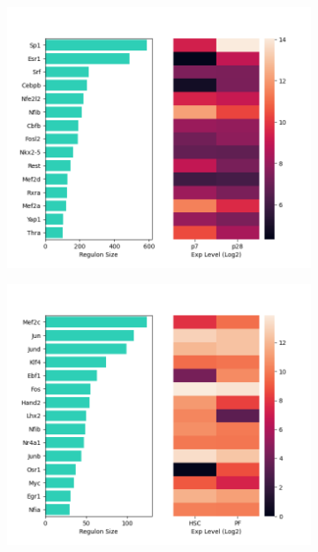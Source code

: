 \documentclass[fleqn,10pt]{wlscirep}
\begin{document}
\begin{figure}
    \begin{subfigure}{0.49\linewidth}
      \centering
      \includegraphics[width=\linewidth, keepaspectratio,]{../images/CMp7d_CMp28d_top.png}
      \caption{}
    \end{subfigure}
    \begin{subfigure}{0.49\linewidth}
      \centering
      \includegraphics[width=\linewidth, keepaspectratio,]{../images/HSCp6w_PFp6w_top.png}
      \caption{}
    \end{subfigure}


\end{figure}
\end{document}
